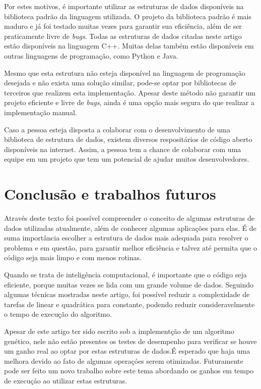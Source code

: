 \documentclass[12pt]{article}
\begin{document}
Por estes motivos, \'{e} importante utilizar as estruturas de dados dispon\'{i}veis na biblioteca padr\~{a}o da linguagem
utilizada. O projeto da biblioteca padr\~{a}o \'{e} mais maduro e j\'{a} foi testado muitas vezes para garantir sua
efici\^{e}ncia, al\'{e}m de ser praticamente livre de \textit{bugs}. Todas as estruturas de dados citadas neste artigo
est\~{a}o dispon\'{i}veis na linguagem C++. Muitas delas tamb\'{e}m est\~{a}o dispon\'{i}veis em outras linguagens de
programa\c{c}\~{a}o, como Python e Java.

Mesmo que esta estrutura n\~{a}o esteja dispon\'{i}vel na linguagem de programa\c{c}\~{a}o desejada e n\~{a}o exista
uma solu\c{c}\~{a}o similar, pode-se optar por bibliotecas de terceiros que realizem esta implementa\c{c}\~{a}o. Apesar deste
m\'{e}todo n\~{a}o garantir um projeto eficiente e livre de \textit{bugs}, ainda \'{e} uma op\c{c}\~{a}o mais segura
do que realizar a implementa\c{c}\~{a}o manual.

Caso a pessoa esteja disposta a colaborar com o desenvolvimento de uma biblioteca de estrutura de dados, existem
diversos resposit\'{a}rios de c\'{o}digo aberto dispon\'{i}veis na internet. Assim, a pessoa tem a chance de
colaborar com uma equipe em um projeto que tem um potencial de ajudar muitos desenvolvedores.

\section{Conclus\~{a}o e trabalhos futuros}

Atrav\'{e}s deste texto foi poss\'{i}vel compreender o conceito de algumas estruturas de dados utilizadas
atualmente, al\'{e}m de conhecer algumas aplica\c{c}\~{o}es para elas. \'{E} de suma import\^{a}ncia escolher a estrutura
de dados mais adequada para resolver o problema e em quest\~{a}o, para garantir melhor efici\^{e}ncia e talvez at\'{e}
permita que o c\'{o}digo seja mais limpo e com menos rotinas.

Quando se trata de intelig\^{e}ncia computacional, \'{e} importante que o c\'{o}digo seja eficiente, porque muitas
vezes se lida com um grande volume de dados. Seguindo algumas t\'{e}cnicas mostradas neste artigo, foi poss\'{i}vel
reduzir a complexidade de tarefas de linear e quadr\'{a}tica para constante, podendo reduzir consideravelmente o tempo de
execu\c{c}\~{a}o do algoritmo.

Apesar de este artigo ter sido escrito sob a implement\c{c}\~{a}o de um algoritmo gen\'{e}tico, nele n\~{a}o est\~{a}o
presentes os testes de desempenho para verificar se houve um ganho real ao optar por estas estruturas de dados.\'{E} esperado
que haja uma melhora devido ao fato de algumas opera\c{c}\'{o}es serem otimizadas. Futuramente pode ser feito um novo
trabalho sobre este tema abordando os ganhos em tempo de execu\c{c}\'{a}o ao utilizar estas estruturas.
\end{document}
